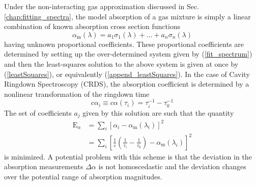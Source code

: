 Under the non-interacting gas approximation discussed in Sec. \ref{chap:fitting_spectra}, the model absorption of a gas mixture is simply a linear combination of known absorption cross section functions
\begin{equation}
	\alpha_\mathrm{m}(\lambda) = a_1 \sigma_1 (\lambda) + \ldots + a_n \sigma_n(\lambda)
\end{equation}
having unknown proportional coefficients. These proportional coefficients are determined by setting up the over-determined system given by (\ref{fit_spectrum})
and then the least-squares solution to the above system is given at once by (\ref{leastSquares}), or equivalently (\ref{append_leastSquares}). In the case of Cavity Ringdown Spectroscopy (CRDS), the absorption coefficient is determined by a nonlinear transformation of the ringdown time
\begin{equation}\label{alpha_crds_appdx}
	c\alpha_i \equiv c\alpha(\tau_i) = \tau_i^{-1} - \tau_0^{-1}
\end{equation}
The set of coefficients $a_j$ given by this solution are such that the quantity
\begin{align} \label{error_alpha}
	\mathrm{E}_\alpha &= \sum_{i} \left[ \alpha_i - \alpha_\text{m}(\lambda_i) \right]^2 \nonumber \\
	&= \sum_{i} \left[\frac{1}{c}\left(\frac{1}{\tau_i} - \frac{1}{\tau_0} \right) - \alpha_\mathrm{m}(\lambda_i) \right]^2
\end{align}
is minimized. A potential problem with this scheme is that the deviation in the absorption measurements $\Delta \alpha$ is not homoscedastic and the deviation changes over the potential range of absorption magnitudes. 

